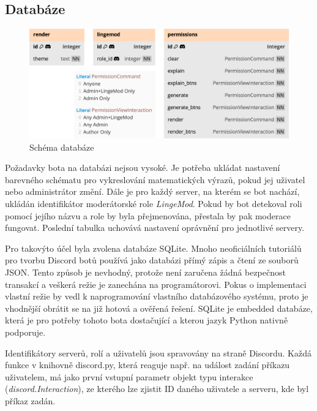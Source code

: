 \documentclass[FM]{tulthesis}
\begin{document}
	
	\subsection{Databáze}
	
	\begin{figure}[ht]
		\centering
		\includegraphics[width=\textwidth]{img/Database}
		\caption{Schéma databáze}
		\label{_tag_img_db}
	\end{figure}
	
	Požadavky bota na databázi nejsou vysoké. Je potřeba ukládat nastavení barevného schématu pro vykreslování matematických výrazů, pokud jej uživatel nebo administrátor změní. Dále je pro každý server, na kterém se bot nachází, ukládán identifikátor moderátorské role \textit{LingeMod}. Pokud by bot detekoval roli pomocí jejího názvu a role by byla přejmenována, přestala by pak moderace fungovat. Poslední tabulka uchovává nastavení oprávnění pro jednotlivé servery.
	
	Pro takovýto účel byla zvolena databáze SQLite. Mnoho neoficiálních tutoriálů pro tvorbu Discord botů používá jako databázi přímý zápis a čtení ze souborů JSON. Tento způsob je nevhodný, protože není zaručena žádná bezpečnost transakcí a veškerá režie je zanechána na programátorovi. Pokus o implementaci vlastní režie by vedl k naprogramování vlastního databázového systému, proto je vhodnější obrátit se na již hotová a ověřená řešení. SQLite je embedded databáze, která je pro potřeby tohoto bota dostačující a kterou jazyk Python nativně podporuje.
	
	Identifikátory serverů, rolí a uživatelů jsou spravovány na straně Discordu. Každá funkce v knihovně discord.py, která reaguje např. na událost zadání příkazu uživatelem, má jako první vstupní parametr objekt typu interakce (\textit{discord.Interaction}), ze kterého lze zjistit ID daného uživatele a serveru, kde byl příkaz zadán. 
	
\end{document}
